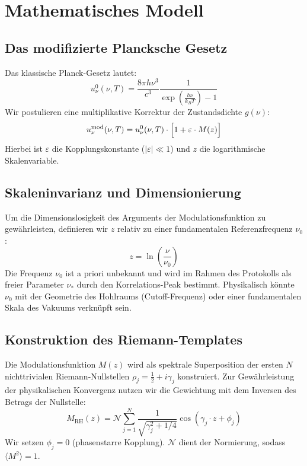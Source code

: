 \documentclass[11pt, a4paper]{article}
\begin{document}
	\section{Mathematisches Modell}
	
	\subsection{Das modifizierte Plancksche Gesetz}
	Das klassische Planck-Gesetz lautet:
	\begin{equation}
		u_\nu^{0}(\nu,T) = \frac{8\pi h \nu^3}{c^3} \frac{1}{\exp\left(\frac{h\nu}{k_B T}\right)-1}
	\end{equation}
	Wir postulieren eine multiplikative Korrektur der Zustandsdichte $g(\nu)$:
	\begin{equation}
		u_\nu^{\text{mod}}(\nu,T) = u_\nu^{0}(\nu,T) \cdot \Bigl[ 1 + \varepsilon \cdot M(z) \Bigr]
	\end{equation}
	Hierbei ist $\varepsilon$ die Kopplungskonstante ($|\varepsilon| \ll 1$) und $z$ die logarithmische Skalenvariable.
	
	\subsection{Skaleninvarianz und Dimensionierung}
	Um die Dimensionslosigkeit des Arguments der Modulationsfunktion zu gewährleisten, definieren wir $z$ relativ zu einer fundamentalen Referenzfrequenz $\nu_0$:
	\begin{equation}
		z = \ln\left(\frac{\nu}{\nu_0}\right)
	\end{equation}
	Die Frequenz $\nu_0$ ist a priori unbekannt und wird im Rahmen des Protokolls als freier Parameter $\nu_*$ durch den Korrelations-Peak bestimmt. Physikalisch könnte $\nu_0$ mit der Geometrie des Hohlraums (Cutoff-Frequenz) oder einer fundamentalen Skala des Vakuums verknüpft sein.
	
	\subsection{Konstruktion des Riemann-Templates}
	Die Modulationsfunktion $M(z)$ wird als spektrale Superposition der ersten $N$ nichttrivialen Riemann-Nullstellen $\rho_j = \frac{1}{2} + i\gamma_j$ konstruiert. Zur Gewährleistung der physikalischen Konvergenz nutzen wir die Gewichtung mit dem Inversen des Betrags der Nullstelle:
	\begin{equation}
		M_{\text{RH}}(z) = \mathcal{N} \sum_{j=1}^{N} \frac{1}{\sqrt{\gamma_j^2 + 1/4}} \cos(\gamma_j \cdot z + \phi_j)
	\end{equation}
	Wir setzen $\phi_j=0$ (phasenstarre Kopplung). $\mathcal{N}$ dient der Normierung, sodass $\langle M^2 \rangle = 1$.
	
\end{document}
